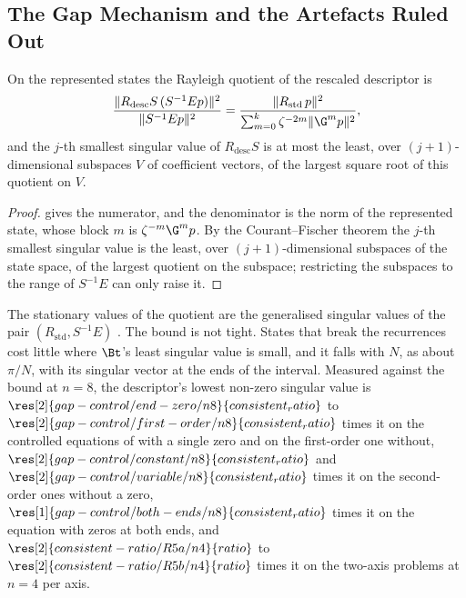\subsection{The Gap Mechanism and the Artefacts Ruled Out}
\label{app:descriptor-gap}

\begin{proposition}
\label{prop:descriptor-quotient}
On the represented states the Rayleigh quotient of the rescaled descriptor is
\begin{equation}
    \frac{\|R_{\mathrm{desc}}S\,(S^{-1}Ep)\|^2}{\|S^{-1}Ep\|^2}
    =\frac{\|R_{\mathrm{std}}\,p\|^2}{\sum_{m=0}^{k}\zeta^{-2m}\|\G^mp\|^2},
\end{equation}
and the $j$-th smallest singular value of $R_{\mathrm{desc}}S$ is at most the least, over $(j+1)$-dimensional subspaces $V$ of coefficient vectors, of the largest square root of this quotient on $V$.
\end{proposition}
\begin{proof}
 gives the numerator, and the denominator is the norm of the represented state, whose block $m$ is $\zeta^{-m}\G^mp$. By the Courant--Fischer theorem the $j$-th smallest singular value is the least, over $(j+1)$-dimensional subspaces of the state space, of the largest quotient on the subspace; restricting the subspaces to the range of $S^{-1}E$ can only raise it.
\end{proof}

The stationary values of the quotient are the generalised singular values of the pair $(R_{\mathrm{std}},S^{-1}E)$ \cite{vanloan1976gsvd}. The bound is not tight. States that break the recurrences cost little where $\Bt$'s least singular value is small, and it falls with $N$, as about $\pi/N$, with its singular vector at the ends of the interval. Measured against the bound at $n=8$, the descriptor's lowest non-zero singular value is $\res[2]{gap-control/end-zero/n8}{consistent_ratio}$ to $\res[2]{gap-control/first-order/n8}{consistent_ratio}$ times it on the controlled equations of  with a single zero and on the first-order one without, $\res[2]{gap-control/constant/n8}{consistent_ratio}$ and $\res[2]{gap-control/variable/n8}{consistent_ratio}$ times it on the second-order ones without a zero, $\res[1]{gap-control/both-ends/n8}{consistent_ratio}$ times it on the equation with zeros at both ends, and $\res[2]{consistent-ratio/R5a/n4}{ratio}$ to $\res[2]{consistent-ratio/R5b/n4}{ratio}$ times it on the two-axis problems at $n=4$ per axis.

